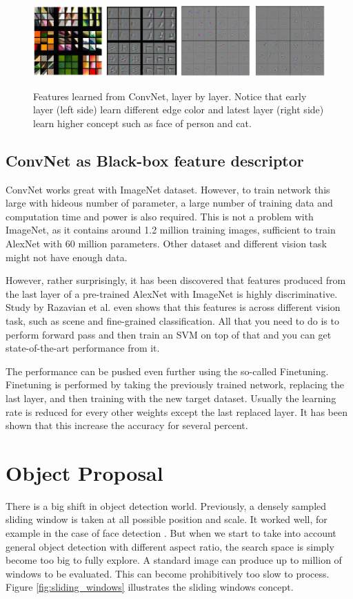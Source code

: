 \documentclass[a4paper,11pt]{kth-mag}
\begin{document}
\begin{figure}[h]
\centering
\includegraphics[scale=0.5]{image/convnet_features.png}
\label{fig:convnet_features}
\caption{Features learned from ConvNet, layer by layer. Notice that early layer (left side) learn different edge color and latest layer (right side) learn higher concept such as face of person and cat.}
\end{figure}

\subsection{ConvNet as Black-box feature descriptor}
ConvNet works great with ImageNet dataset. However, to train network this large with hideous number of parameter, a large number of training data and computation time and power is also required. This is not a problem with ImageNet, as it contains around 1.2 million training images, sufficient to train AlexNet with 60 million parameters. Other dataset and different vision task might not have enough data.

However, rather surprisingly, it has been discovered that features produced from the last layer of a pre-trained AlexNet with ImageNet is highly discriminative. Study by Razavian et al. \cite{razavian} even shows that this features is across different vision task, such as scene and fine-grained classification. All that you need to do is to perform forward pass and then train an SVM on top of that and you can get state-of-the-art performance from it.

The performance can be pushed even further using the so-called Finetuning. Finetuning is performed by taking the previously trained network, replacing the last layer, and then training with the new target dataset. Usually the learning rate is reduced for every other weights except the last replaced layer. It has been shown that this increase the accuracy for several percent.

\section{Object Proposal}
There is a big shift in object detection world. Previously, a densely sampled sliding window is taken at all possible position and scale. It worked well, for example in the case of face detection \cite{violajones}. But when we start to take into account general object detection with different aspect ratio, the search space is simply become too big to fully explore. A standard image can produce up to million of windows to be evaluated. This can become prohibitively too slow to process. Figure \ref{fig:sliding_windows} illustrates the sliding windows concept.
\end{document}

